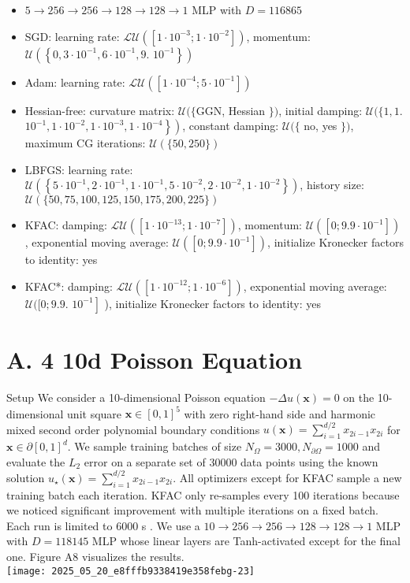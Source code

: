 \documentclass[10pt]{article}
\begin{document}
\begin{itemize}
  \item $5 \rightarrow 256 \rightarrow 256 \rightarrow 128 \rightarrow 128 \rightarrow 1$ MLP with $D=116865$
  \item SGD: learning rate: $\mathcal{L U}\left(\left[1 \cdot 10^{-3} ; 1 \cdot 10^{-2}\right]\right)$, momentum: $\mathcal{U}\left(\left\{0,3 \cdot 10^{-1}, 6 \cdot 10^{-1}, 9\right.\right.$. $\left.\left.10^{-1}\right\}\right)$
  \item Adam: learning rate: $\mathcal{L U}\left(\left[1 \cdot 10^{-4} ; 5 \cdot 10^{-1}\right]\right)$
  \item Hessian-free: curvature matrix: $\mathcal{U}(\{\mathrm{GGN}$, Hessian $\})$, initial damping: $\mathcal{U}(\{1,1$. $\left.\left.10^{-1}, 1 \cdot 10^{-2}, 1 \cdot 10^{-3}, 1 \cdot 10^{-4}\right\}\right)$, constant damping: $\mathcal{U}(\{$ no, yes $\})$, maximum CG iterations: $\mathcal{U}(\{50,250\})$
  \item LBFGS: learning rate: $\mathcal{U}\left(\left\{5 \cdot 10^{-1}, 2 \cdot 10^{-1}, 1 \cdot 10^{-1}, 5 \cdot 10^{-2}, 2 \cdot 10^{-2}, 1 \cdot 10^{-2}\right\}\right)$, history size: $\mathcal{U}(\{50,75,100,125,150,175,200,225\})$
  \item KFAC: damping: $\mathcal{L U}\left(\left[1 \cdot 10^{-13} ; 1 \cdot 10^{-7}\right]\right)$, momentum: $\mathcal{U}\left(\left[0 ; 9.9 \cdot 10^{-1}\right]\right)$, exponential moving average: $\mathcal{U}\left(\left[0 ; 9.9 \cdot 10^{-1}\right]\right)$, initialize Kronecker factors to identity: yes
  \item KFAC*: damping: $\mathcal{L U}\left(\left[1 \cdot 10^{-12} ; 1 \cdot 10^{-6}\right]\right)$, exponential moving average: $\mathcal{U}([0 ; 9.9$. $\left.10^{-1}\right]$ ), initialize Kronecker factors to identity: yes
\end{itemize}

\section*{A. 4 10d Poisson Equation}
Setup We consider a 10-dimensional Poisson equation $-\Delta u(\boldsymbol{x})=0$ on the 10-dimensional unit square $\boldsymbol{x} \in[0,1]^{5}$ with zero right-hand side and harmonic mixed second order polynomial boundary conditions $u(\boldsymbol{x})=\sum_{i=1}^{d / 2} x_{2 i-1} x_{2 i}$ for $\boldsymbol{x} \in \partial[0,1]^{d}$. We sample training batches of size $N_{\Omega}=3000, N_{\partial \Omega}=1000$ and evaluate the $L_{2}$ error on a separate set of 30000 data points using the known solution $u_{\star}(\boldsymbol{x})=\sum_{i=1}^{d / 2} x_{2 i-1} x_{2 i}$. All optimizers except for KFAC sample a new training batch each iteration. KFAC only re-samples every 100 iterations because we noticed significant improvement with multiple iterations on a fixed batch. Each run is limited to 6000 s . We use a $10 \rightarrow 256 \rightarrow 256 \rightarrow 128 \rightarrow 128 \rightarrow 1$ MLP with $D=118145$ MLP whose linear layers are Tanh-activated except for the final one. Figure A8 visualizes the results.\\
\texttt{[image: 2025\_05\_20\_e8fffb9338419e358febg-23]}
\end{document}
